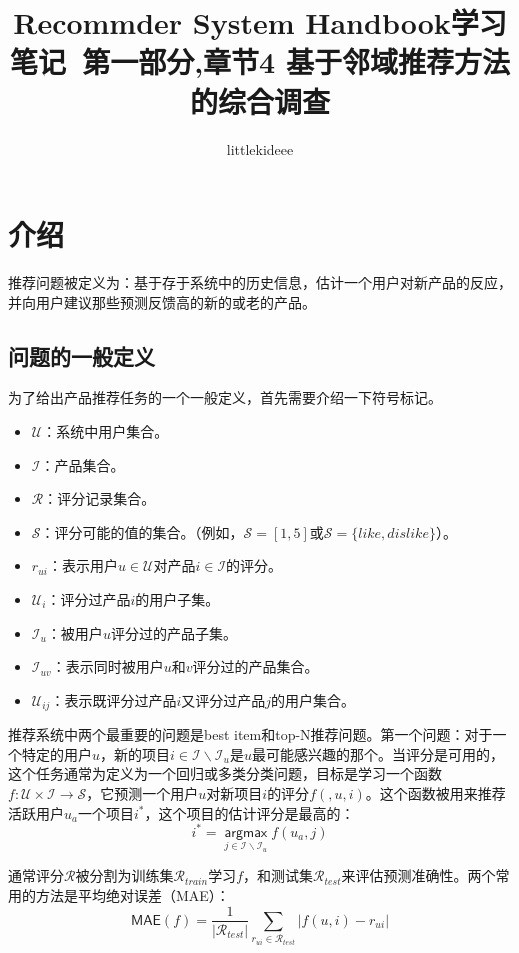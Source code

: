 \documentclass{article}
\begin{document}
 \title{Recommder System Handbook学习笔记\ 第一部分,章节4 基于邻域推荐方法的综合调查}
 \author{littlekideee}
 \maketitle

 \section{介绍}
 推荐问题被定义为：基于存于系统中的历史信息，估计一个用户对新产品的反应，并向用户建议那些预测反馈高的新的或老的产品。

 \subsection{问题的一般定义}
 为了给出产品推荐任务的一个一般定义，首先需要介绍一下符号标记。
 \begin{itemize}
 \item $\mathcal{U}$：系统中用户集合。
 \item $\mathcal{I}$：产品集合。
 \item $\mathcal{R}$：评分记录集合。
 \item $\mathcal{S}$：评分可能的值的集合。（例如，$\mathcal{S}=[1,5]$或$\mathcal{S}=\{like,dislike\}$）。
 \item $r_{ui}$：表示用户$u\in \mathcal{U}$对产品$i\in\mathcal{I}$的评分。
 \item $\mathcal{U}_i$：评分过产品$i$的用户子集。
 \item $\mathcal{I}_u$：被用户$u$评分过的产品子集。
 \item $\mathcal{I}_{uv}$：表示同时被用户$u$和$v$评分过的产品集合。
 \item $\mathcal{U}_{ij}$：表示既评分过产品$i$又评分过产品$j$的用户集合。
 \end{itemize}

 推荐系统中两个最重要的问题是best item和top-N推荐问题。第一个问题：对于一个特定的用户$u$，新的项目$i\in\mathcal{I}\backslash\mathcal{I}_u$是$u$最可能感兴趣的那个。当评分是可用的，这个任务通常为定义为一个回归或多类分类问题，目标是学习一个函数$f:\mathcal{U}\times\mathcal{I}\to\mathcal{S}$，它预测一个用户$u$对新项目$i$的评分$f(,u,i)$。这个函数被用来推荐活跃用户$u_a$一个项目$i^*$，这个项目的估计评分是最高的：
 $$ i^*=\mathop{\mathsf{argmax}}\limits_{j\in\mathcal{I}\backslash\mathcal{I}_u}f(u_a,j) $$

 通常评分$\mathcal{R}$被分割为训练集$\mathcal{R}_{train}$学习$f$，和测试集$\mathcal{R}_{test}$来评估预测准确性。两个常用的方法是平均绝对误差（MAE）：
 $$ \mathsf{MAE}(f)=\frac{1}{|\mathcal{R}_{test}|}\mathop{\sum}\limits_{r_{ui}\in\mathcal{R}_{test}}|f(u,i)-r_{ui}| $$
\end{document}
